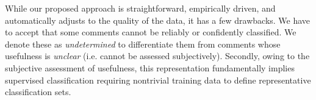 %
%
%
%
%
% 

While our proposed approach is straightforward, empirically driven, and automatically adjusts to the quality of the data, it has a few drawbacks.
We have to accept that some comments cannot be reliably or confidently classified.
We denote these as \emph{undetermined} to differentiate them from comments whose usefulness is \emph{unclear} (i.e. cannot be assessed subjectively).
Secondly, owing to the subjective assessment of usefulness, this representation fundamentally implies supervised classification requiring nontrivial training data to define representative classification sets.




